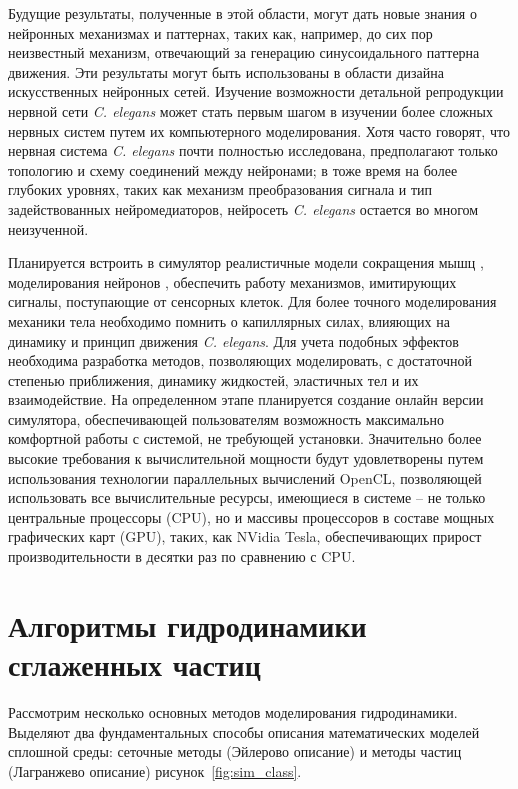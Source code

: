 Будущие результаты, полученные в этой области, могут дать новые знания о нейронных механизмах и паттернах, таких как, например, до сих пор неизвестный механизм, отвечающий за генерацию синусоидального паттерна движения. Эти результаты могут быть использованы в области дизайна искусственных нейронных сетей. Изучение возможности детальной репродукции нервной сети \textit{C. elegans} может стать  первым шагом в изучении более сложных нервных систем путем их компьютерного моделирования. Хотя часто говорят, что нервная система \textit{C. elegans} почти полностью исследована, предполагают только топологию и схему соединений между нейронами; в тоже время на более глубоких уровнях, таких как механизм преобразования сигнала и тип задействованных нейромедиаторов, нейросеть \textit{C. elegans} остается во многом неизученной.

Планируется встроить в симулятор реалистичные модели сокращения мышц \cite {Huxley1957MuscleSA}, моделирования нейронов \cite {Gleeson2010}, обеспечить работу механизмов, имитирующих сигналы, поступающие от сенсорных клеток. Для более точного моделирования механики тела необходимо помнить о капиллярных силах, влияющих на динамику и принцип движения \textit{C. elegans}. Для учета подобных эффектов необходима разработка методов, позволяющих моделировать, с достаточной степенью приближения, динамику жидкостей, эластичных тел и их взаимодействие. На определенном этапе планируется создание онлайн версии симулятора, обеспечивающей пользователям возможность максимально комфортной работы с системой, не требующей установки. Значительно более высокие требования к вычислительной мощности будут удовлетворены путем использования технологии параллельных вычислений OpenCL, позволяющей использовать все вычислительные ресурсы, имеющиеся в системе – не только центральные процессоры (CPU), но и массивы процессоров в составе мощных графических карт (GPU), таких, как NVidia Tesla, обеспечивающих прирост производительности в десятки раз по сравнению с CPU.

\section{Алгоритмы гидродинамики сглаженных частиц}\label{sec:ch1/sec3}

Рассмотрим несколько основных методов моделирования гидродинамики. Выделяют два фундаментальных способы описания математических моделей сплошной среды: сеточные методы (Эйлерово описание) и методы частиц  (Лагранжево описание) рисунок~\ref{fig:sim_class}.

